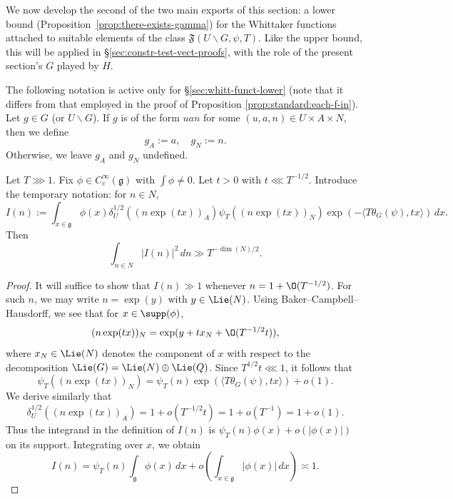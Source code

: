 We now develop the second of the two main exports of this section: a lower bound (Proposition~\ref{prop:there-exists-gamma}) for the Whittaker functions attached to suitable elements of the class $\mathfrak{F}(U \backslash G, \psi, T)$.  Like the upper bound, this will be applied in \S\ref{sec:constr-test-vect-proofs}, with the role of the present section's $G$ played by $H$.

\begin{notation}
  The following notation is active only for \S\ref{sec:whitt-funct-lower} (note that it differs from that employed in the proof of Proposition \ref{prop:standard:each-f-in}).  Let $g \in G$ (or $U \backslash G$).  If $g$ is of the form $u a n$ for some $(u,a,n) \in U \times A \times N$, then we define
  \begin{equation*}
    g_A := a,
    \quad
    g_N := n.
  \end{equation*}
  Otherwise, we leave $g_A$ and $g_N$ undefined.
\end{notation}


\begin{lemma}
  Let $T \ggg 1$.  Fix $\phi \in C_c^\infty(\mathfrak{g})$ with $\int \phi \neq 0$.  Let $t > 0$ with $t \lll T^{-1/2}$.  Introduce the temporary notation: for $n \in N$,
  \begin{equation*}
    I(n) :=
    \int_{x \in \mathfrak{g}}
    \phi(x) \delta_U^{1/2}((n \exp(t x))_A)
    \psi_T ( (n \exp(t x))_N)
    \exp (- \langle T \theta_G(\psi), t x \rangle) \, d x.
  \end{equation*}
  Then
  \begin{equation*}
    \int_{n \in N}
    \left\lvert
      I(n)
    \right\rvert^2
    \, d n
    \gg T^{-\dim(N)/2}.
  \end{equation*}
\end{lemma}
\begin{proof}
  It will suffice to show that $I(n) \gg 1$ whenever $n = 1 + \O(T^{-1/2})$.  For such $n$, we may write $n = \exp(y)$ with $y \in \Lie(N)$.  Using Baker--Campbell--Hausdorff, we see that for $x \in \supp(\phi)$,
  \begin{equation*}
    (n \exp(tx))_N = \exp(y + t x_N + \O(T^{-1/2} t)),
  \end{equation*}
  where $x_N \in \Lie(N)$ denotes the component of $x$ with respect to the decomposition $\Lie(G) = \Lie(N) \oplus \Lie(Q)$.  Since $T^{1/2} t \lll 1$, it follows that
  \begin{equation*}
    \psi_T((n \exp(t x))_N) = \psi_T(n) \exp (\langle T \theta_G(\psi), t x \rangle) + o(1).
  \end{equation*}
  We derive similarly that
  \begin{equation*}
    \delta_U^{1/2}((n \exp(t x))_A) = 1 + o(T^{-1/2} t) = 1 + o(T^{-1}) = 1 + o(1).
  \end{equation*}
  Thus the integrand in the definition of $I(n)$ is $\psi_T(n) \phi(x) + o(|\phi(x)|)$ on its support.  Integrating over $x$, we obtain
  \begin{equation*}
    I(n) = \psi_T(n) \int_{\mathfrak{g} } \phi(x) \, d x + o( \int_{x \in \mathfrak{g} } |\phi(x)| \, d x)
    \asymp 1.
  \end{equation*}
\end{proof}

